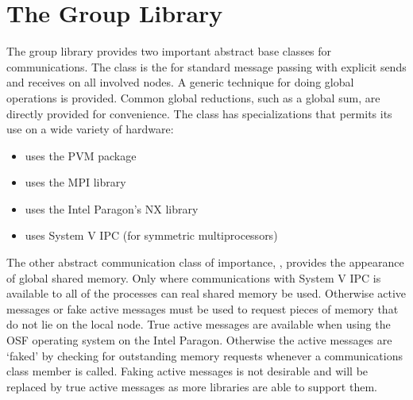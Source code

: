 
\chapter{The Group Library}

The group library provides two important abstract base
classes for communications.  The  class
is the for standard message passing with explicit sends and
receives on all involved nodes.  A generic technique for
doing global operations is provided.  Common global
reductions, such as a global sum, are directly provided for
convenience.  The  class has
specializations that permits its use on a wide variety of
hardware:

\begin{itemize}
\item {} uses the PVM package
\item {} uses the MPI library
\item {} uses the Intel Paragon's NX library
\item {} uses System V IPC (for
      symmetric multiprocessors)
\end{itemize}

The other abstract communication class of importance,
, provides the appearance of global
shared memory.  Only where communications with System V IPC
is available to all of the processes can real shared memory
be used.  Otherwise active messages or fake active messages
must be used to request pieces of memory that do not lie on
the local node.  True active messages are available when
using the OSF operating system on the Intel Paragon.
Otherwise the active messages are `faked' by checking for
outstanding memory requests whenever a communications class
member is called.  Faking active messages is not desirable
and will be replaced by true active messages as more
libraries are able to support them.

